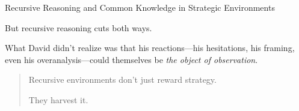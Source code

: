 \begin{TechnicalSidebar}{Recursive Reasoning and Common Knowledge in Strategic Environments}
    \medskip
    
    But recursive reasoning cuts both ways.

    \medskip
    
    What David didn’t realize was that his reactions—his hesitations, his framing, even his 
    overanalysis—could themselves be \emph{the object of observation}.
    
    \begin{quote}
    Recursive environments don’t just reward strategy.
    
    They harvest it.
    \end{quote}
    
\end{TechnicalSidebar}


